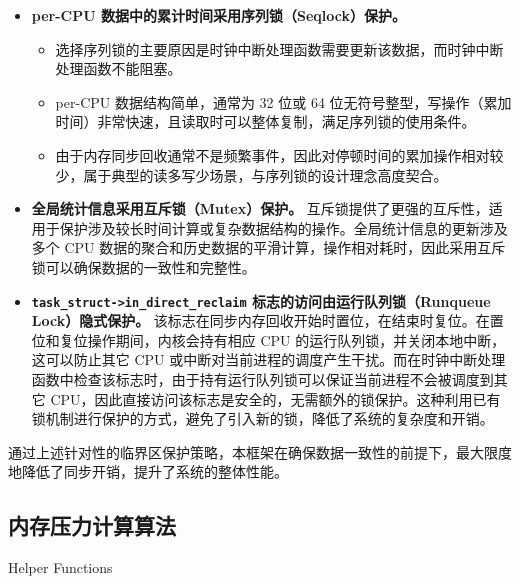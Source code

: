 \begin{itemize}
    \item \textbf{per-CPU 数据中的累计时间采用序列锁（Seqlock）保护。}
    \begin{itemize}
        \item 选择序列锁的主要原因是时钟中断处理函数需要更新该数据，而时钟中断处理函数不能阻塞。
        \item per-CPU 数据结构简单，通常为 32 位或 64 位无符号整型，写操作（累加时间）非常快速，且读取时可以整体复制，满足序列锁的使用条件。
        \item 由于内存同步回收通常不是频繁事件，因此对停顿时间的累加操作相对较少，属于典型的读多写少场景，与序列锁的设计理念高度契合。
    \end{itemize}

    \item \textbf{全局统计信息采用互斥锁（Mutex）保护。} 互斥锁提供了更强的互斥性，适用于保护涉及较长时间计算或复杂数据结构的操作。全局统计信息的更新涉及多个 CPU 数据的聚合和历史数据的平滑计算，操作相对耗时，因此采用互斥锁可以确保数据的一致性和完整性。

    \item \textbf{\texttt{task\_struct->in\_direct\_reclaim} 标志的访问由运行队列锁（Runqueue Lock）隐式保护。}
    该标志在同步内存回收开始时置位，在结束时复位。在置位和复位操作期间，内核会持有相应 CPU 的运行队列锁，并关闭本地中断，这可以防止其它 CPU 或中断对当前进程的调度产生干扰。而在时钟中断处理函数中检查该标志时，由于持有运行队列锁可以保证当前进程不会被调度到其它 CPU，因此直接访问该标志是安全的，无需额外的锁保护。这种利用已有锁机制进行保护的方式，避免了引入新的锁，降低了系统的复杂度和开销。
\end{itemize}

通过上述针对性的临界区保护策略，本框架在确保数据一致性的前提下，最大限度地降低了同步开销，提升了系统的整体性能。


\subsection{内存压力计算算法}
\label{sec:内存压力计算算法}


\begin{algorithm}[H]
    \caption{Helper Functions}
    \label{alg:helper_functions}

\end{algorithm}






